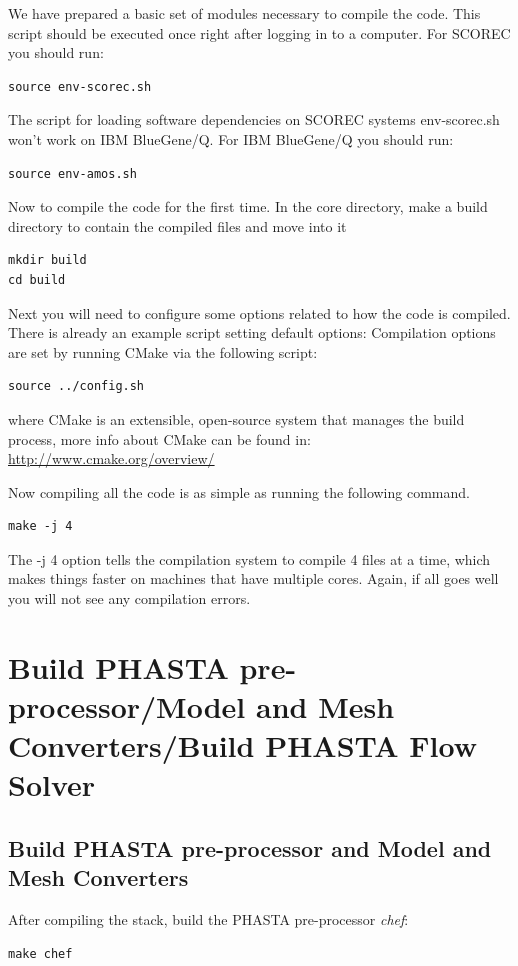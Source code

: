 \documentclass{article}
\begin{document}
We have prepared a basic set of modules necessary to compile the code. This script should be executed once right after logging in to a computer. For SCOREC you should run:
\begin{lstlisting}
source env-scorec.sh
\end{lstlisting}
The script for loading software dependencies on SCOREC systems env-scorec.sh won't work on IBM BlueGene/Q. For IBM BlueGene/Q you should run:
\begin{lstlisting}
source env-amos.sh
\end{lstlisting}

Now to compile the code for the first time. In the core directory, make a build directory to contain the compiled files and move into it
\begin{lstlisting} 
mkdir build
cd build
\end{lstlisting}

Next you will need to configure some options related to how the code is compiled. There is already an example script setting default options:
Compilation options are set by running CMake via the following script:
\begin{lstlisting}
source ../config.sh
\end{lstlisting}
where CMake is an extensible, open-source system that manages the build process, more info about CMake can be found in:\\
\url{http://www.cmake.org/overview/}

Now compiling all the code is as simple as running the following command.
\begin{lstlisting}
make -j 4
\end{lstlisting}

The -j 4 option tells the compilation system to compile 4 files at a time, which makes things faster on machines that have multiple cores.
Again, if all goes well you will not see any compilation errors.

\section{Build PHASTA pre-processor/Model and Mesh Converters/Build PHASTA Flow Solver}
\label{ch:2}
\subsection{Build PHASTA pre-processor and Model and Mesh Converters}

After compiling the stack, build the PHASTA pre-processor \textit{chef}:
\begin{lstlisting}
make chef
\end{lstlisting}
\end{document}
